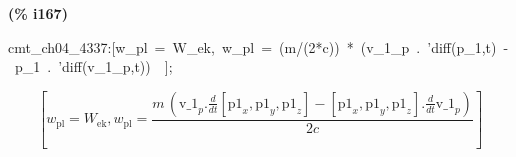 \documentclass[fleqn]{article}
\begin{document}
\noindent
\begin{minipage}[t]{4.000000em}\color{red}\bfseries
(\% i167)	
\end{minipage}
\begin{minipage}[t]{\textwidth}\color{blue}
cmt\_ch04\_4337:[w\_pl\ =\ W\_ek,\ w\_pl\ =\ (m/(2*c))\ *\ (v\_1\_p\ .\ 'diff(p\_1,t)\ -\ p\_1\ .\ 'diff(v\_1\_p,t))\ \ ];
\end{minipage}
\[\displaystyle \tag{\% o167} 
\left[ {w_{\ensuremath{\mathrm{pl}}}}={W_{\ensuremath{\mathrm{ek}}}}\operatorname{,}{w_{\ensuremath{\mathrm{pl}}}}=\frac{m\, \left( {{\ensuremath{\mathrm{v\_ 1}}}_p}\ensuremath{\mathrm{ . }}\frac{d}{d t} \left[ {{\ensuremath{\mathrm{p1}}}_x}\operatorname{,}{{\ensuremath{\mathrm{p1}}}_y}\operatorname{,}{{\ensuremath{\mathrm{p1}}}_z}\right] -\left[ {{\ensuremath{\mathrm{p1}}}_x}\operatorname{,}{{\ensuremath{\mathrm{p1}}}_y}\operatorname{,}{{\ensuremath{\mathrm{p1}}}_z}\right] \ensuremath{\mathrm{ . }}\frac{d}{d t} {{\ensuremath{\mathrm{v\_ 1}}}_p}\right) }{2 c}\right] \mbox{}
\]
\end{document}
